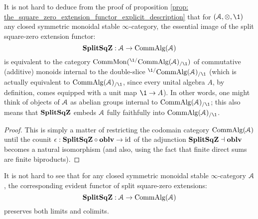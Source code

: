                     \begin{corollary} \label{coro: internal_abelian_groups}
                        It is not hard to deduce from the proof of proposition \ref{prop: the_square_zero_extension_functor_explicit_description} that for $(\calA, \tensor, \1)$ any closed symmetric monoidal stable $\infty$-category, the essential image of the split square-zero extension functor:
                            $$\mathbf{Split}\mathbf{Sq}\mathbf{Z}: \mathcal{A} \to \mathrm{Comm}\mathrm{Alg}(\mathcal{A})$$
                        is equivalent to the category $\Comm\Mon( {}^{\1/}\Comm\Alg(\calA)_{/\1} )$ of commutative (additive) monoids internal to the double-slice ${}^{\1/}\Comm\Alg(\calA)_{/\1}$ (which is actually equivalent to $\Comm\Alg(\calA)_{/\1}$, since every unital algebra $A$, by definition, comes equipped with a unit map $\1 \to A$). In other words, one might think of objects of $\mathcal{A}$ as abelian groups internal to $\Comm\Alg(\calA)_{/\1}$; this also means that $\mathbf{Split}\mathbf{Sq}\mathbf{Z}$ embeds $\mathcal{A}$ fully faithfully into $\Comm\Alg(\calA)_{/\1}$.
                    \end{corollary}
                        \begin{proof}
                            This is simply a matter of restricting the codomain category $\mathrm{Comm}\mathrm{Alg}(\mathcal{A})$ until the counit $\epsilon: \mathbf{Split}\mathbf{Sq}\mathbf{Z} \circ \mathbf{oblv} \to \mathrm{id}$ of the adjunction $\mathbf{Split}\mathbf{Sq}\mathbf{Z} \dashv \mathbf{oblv}$ becomes a natural isomorphism (and also, using the fact that finite direct sums are finite biproducts).
                        \end{proof}
                    \begin{remark} \label{remark: square_zero_extension_functor_preserves_(co)limits}
                        It is not hard to see that for any closed symmetric monoidal stable $\infty$-category $\mathcal{A}$, the corresponding evident functor of split square-zero extensions:
                            $$\mathbf{Split}\mathbf{Sq}\mathbf{Z}: \mathcal{A} \to \mathrm{Comm}\mathrm{Alg}(\mathcal{A})$$
                        preserves both limits and colimits.
                    \end{remark}
                    
